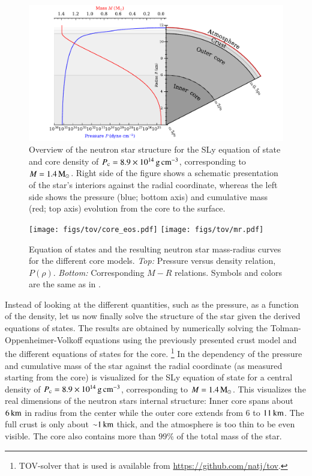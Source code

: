 \begin{figure}[t!]
\centering
\includegraphics[width=13.5cm]{figs/slice/slice.pdf}
\caption{\label{fig:slice}
Overview of the neutron star structure for the SLy equation of state and core density of $P_{\mathrm{c}} = 8.9 \times 10^{14}\, \mathrm{g}\,\mathrm{cm}^{-3}$, corresponding to $M=1.4\, \mathrm{M}_{\odot}$.
Right side of the figure shows a schematic presentation of the star's interiors against the radial coordinate, whereas the left side shows the pressure (blue; bottom axis) and cumulative mass (red; top axis) evolution from the core to the surface.
}
\end{figure}

\begin{figure}[t!]
\centering
\texttt{[image: figs/tov/core\_eos.pdf]}
\texttt{[image: figs/tov/mr.pdf]}
\caption{\label{fig:coreMR}
Equation of states and the resulting neutron star mass-radius curves for the different core models.
\emph{Top:} Pressure versus density relation, $P(\rho)$.
\emph{Bottom:} Corresponding $M-R$ relations.
Symbols and colors are the same as in .
}
\end{figure}

Instead of looking at the different quantities, such as the pressure, as a function of the density, let us now finally solve the structure of the star given the derived equations of states.
The results are obtained by numerically solving the Tolman-Oppenheimer-Volkoff equations using the previously presented crust model and the different equations of states for the core.%
\footnote{TOV-solver that is used is available from \url{https://github.com/natj/tov}.}
In  the dependency of the pressure and cumulative mass of the star against the radial coordinate (as measured starting from the core) is visualized for the SLy equation of state for a central density of $P_{\mathrm{c}} = 8.9 \times 10^{14}\, \mathrm{g}\,\mathrm{cm}^{-3}$, corresponding to $M=1.4\, \mathrm{M}_{\odot}$.
This visualizes the real dimensions of the neutron stars internal structure:
Inner core spans about $6\, \mathrm{km}$ in radius from the center while the outer core extends from $6$ to $11\, \mathrm{km}$.
The full crust is only about $\mathord{\sim} 1\, \mathrm{km}$ thick, and the atmosphere is too thin to be even visible.
The core also contains more than $99\%$ of the total mass of the star.



